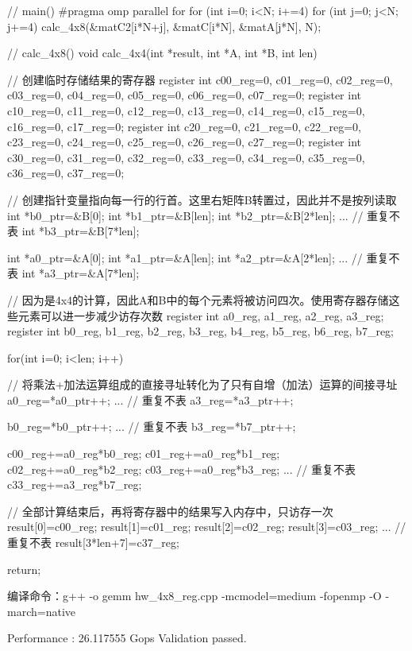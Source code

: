 \documentclass[UTF8,10pt]{ctexart}
\begin{document}
\begin{python}
// main()
#pragma omp parallel for
for (int i=0; i<N; i+=4)
    for (int j=0; j<N; j+=4)
        calc_4x8(&matC2[i*N+j], &matC[i*N], &matA[j*N], N);

// calc_4x8()
void calc_4x4(int *result, int *A, int *B, int len)
{
    // 创建临时存储结果的寄存器
    register int c00_reg=0, c01_reg=0, c02_reg=0, c03_reg=0, c04_reg=0, c05_reg=0, c06_reg=0, c07_reg=0;
    register int c10_reg=0, c11_reg=0, c12_reg=0, c13_reg=0, c14_reg=0, c15_reg=0, c16_reg=0, c17_reg=0;
    register int c20_reg=0, c21_reg=0, c22_reg=0, c23_reg=0, c24_reg=0, c25_reg=0, c26_reg=0, c27_reg=0;
    register int c30_reg=0, c31_reg=0, c32_reg=0, c33_reg=0, c34_reg=0, c35_reg=0, c36_reg=0, c37_reg=0;

    // 创建指针变量指向每一行的行首。这里右矩阵B转置过，因此并不是按列读取
    int *b0_ptr=&B[0];
    int *b1_ptr=&B[len];
    int *b2_ptr=&B[2*len];
    ... // 重复不表
    int *b3_ptr=&B[7*len];


    int *a0_ptr=&A[0];
    int *a1_ptr=&A[len];
    int *a2_ptr=&A[2*len];
    ... // 重复不表
    int *a3_ptr=&A[7*len];

    // 因为是4x4的计算，因此A和B中的每个元素将被访问四次。使用寄存器存储这些元素可以进一步减少访存次数
    register int a0_reg, a1_reg, a2_reg, a3_reg;
    register int b0_reg, b1_reg, b2_reg, b3_reg, b4_reg, b5_reg, b6_reg, b7_reg;

    for(int i=0; i<len; i++)
    {   
        // 将乘法+加法运算组成的直接寻址转化为了只有自增（加法）运算的间接寻址
        a0_reg=*a0_ptr++;
        ... // 重复不表
        a3_reg=*a3_ptr++;

        b0_reg=*b0_ptr++;
        ... // 重复不表
        b3_reg=*b7_ptr++;

        c00_reg+=a0_reg*b0_reg;
        c01_reg+=a0_reg*b1_reg;
        c02_reg+=a0_reg*b2_reg;
        c03_reg+=a0_reg*b3_reg;
        ... // 重复不表
        c33_reg+=a3_reg*b7_reg;
    }

    // 全部计算结束后，再将寄存器中的结果写入内存中，只访存一次
    result[0]=c00_reg;
    result[1]=c01_reg;
    result[2]=c02_reg;
    result[3]=c03_reg;
    ... // 重复不表
    result[3*len+7]=c37_reg;

    return;
}
\end{python}
\begin{python}
编译命令：g++ -o gemm hw_4x8_reg.cpp -mcmodel=medium -fopenmp -O -march=native
\end{python}
\begin{python}
Performance : 26.117555 Gops
Validation passed.
\end{python}
\end{document}
